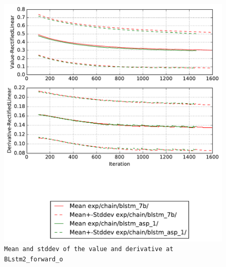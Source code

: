 \documentclass[prl,10pt,twocolumn]{revtex4}
\begin{document}
\newpage
\begin{figure}[h]
  \begin{center}
    \caption{\texttt{Mean and stddev of the value and derivative at BLstm2\_forward\_o}}
    \includegraphics[width=\textwidth]{exp/chain/blstm_7b/report/nonlinstats_BLstm2_forward_o.pdf}
  \end{center}
\end{figure}
\clearpage
\end{document}
